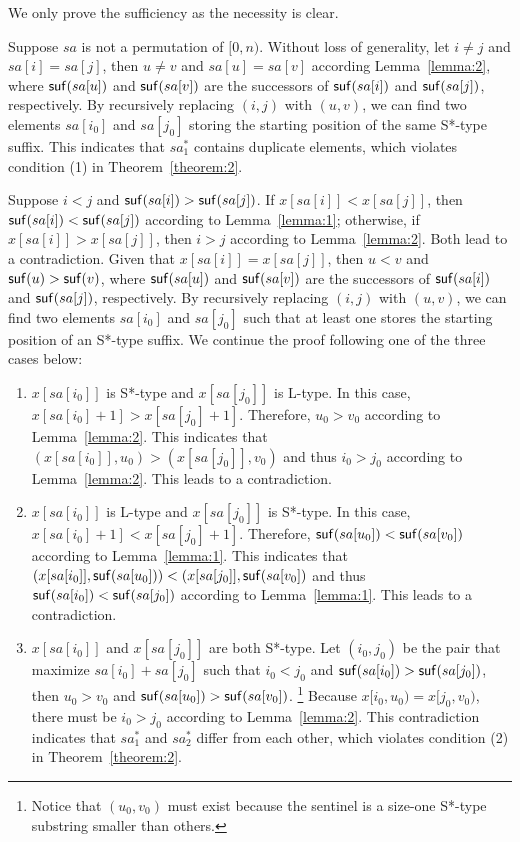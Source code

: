 \documentclass[10pt,journal,compsoc]{IEEEtran}
\begin{document}
\begin{IEEEproof}
	We only prove the sufficiency as the necessity is clear.
	
	Suppose $sa$ is not a permutation of $[0, n)$. Without loss of generality, let $i \ne j$ and $sa[i] = sa[j]$, then $u \ne v$ and $sa[u] = sa[v]$ according Lemma~\ref{lemma:2}, where ${\sf suf}(sa[u])$ and ${\sf suf}(sa[v])$ are the successors of ${\sf suf}(sa[i])$ and ${\sf suf}(sa[j])$, respectively. By recursively replacing $(i, j)$ with $(u, v)$, we can find two elements $sa[i_0]$ and $sa[j_0]$ storing the starting position of the same S*-type suffix. This indicates that $sa^*_1$ contains duplicate elements, which violates condition (1) in Theorem~\ref{theorem:2}.
	
	Suppose $i < j$ and ${\sf suf}(sa[i]) > {\sf suf}(sa[j])$. If $x[sa[i]] < x[sa[j]]$, then ${\sf suf}(sa[i]) < {\sf suf}(sa[j])$ according to Lemma~\ref{lemma:1}; otherwise, if $x[sa[i]] > x[sa[j]]$, then $i > j$ according to Lemma~\ref{lemma:2}. Both lead to a contradiction. Given that $x[sa[i]] = x[sa[j]]$, then $u < v$ and ${\sf suf}(u) > {\sf suf}(v)$, where ${\sf suf}(sa[u])$ and ${\sf suf}(sa[v])$ are the successors of ${\sf suf}(sa[i])$ and ${\sf suf}(sa[j])$, respectively. By recursively replacing $(i, j)$ with $(u, v)$, we can find two elements $sa[i_0]$ and $sa[j_0]$ such that at least one stores the starting position of an S*-type suffix. We continue the proof following one of the three cases below:
	\begin{enumerate}[(1)]
	\item $x[sa[i_0]]$ is S*-type and $x[sa[j_0]]$ is L-type. In this case, $x[sa[i_0] + 1] > x[sa[j_0] + 1]$. Therefore, $u_0 > v_0$ according to Lemma~\ref{lemma:2}. This indicates that $(x[sa[i_0]], u_0) > (x[sa[j_0]], v_0)$ and thus $i_0 > j_0$ according to Lemma~\ref{lemma:2}. This leads to a contradiction.
	\item $x[sa[i_0]]$ is L-type and $x[sa[j_0]]$ is S*-type. In this case, $x[sa[i_0] + 1] < x[sa[j_0] + 1]$. Therefore, ${\sf suf}(sa[u_0]) < {\sf suf}(sa[v_0])$ according to Lemma~\ref{lemma:1}. This indicates that $(x[sa[i_0]], {\sf suf}(sa[u_0])) < (x[sa[j_0]], {\sf suf}(sa[v_0])$ and thus ${\sf suf}(sa[i_0]) < {\sf suf}(sa[j_0])$ according to Lemma~\ref{lemma:1}. This leads to a contradiction.
	\item $x[sa[i_0]]$ and $x[sa[j_0]]$ are both S*-type. Let $(i_0, j_0)$ be the pair that maximize $sa[i_0] + sa[j_0]$ such that $i_0 < j_0$ and ${\sf suf}(sa[i_0]) > {\sf suf}(sa[j_0])$, then $u_0 > v_0$ and ${\sf suf}(sa[u_0]) > {\sf suf}(sa[v_0])$. \footnote{Notice that $(u_0, v_0)$ must exist because the sentinel is a size-one S*-type substring smaller than others.} Because $x[i_0, u_0) = x[j_0, v_0)$, there must be $i_0 > j_0$ according to Lemma~\ref{lemma:2}. This contradiction indicates that $sa^*_1$ and $sa^*_2$ differ from each other, which violates condition (2) in Theorem~\ref{theorem:2}.
	\end{enumerate}

\end{IEEEproof}
\end{document}
